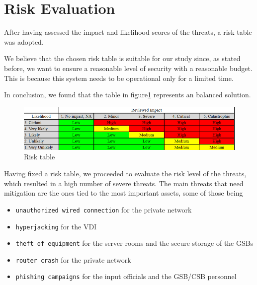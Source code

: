 \section*{Risk Evaluation}

After having assessed the impact and likelihood scores of the threats, a risk table was adopted. 

We believe that the chosen risk table is suitable for our study since, as stated before, we want to ensure a reasonable level of security with a reasonable budget. This is because this system needs to be operational only for a limited time.

In conclusion, we found that the table in figure\ref{fig:riskTable} represents an balanced solution. 

\begin{figure}[]
    \centering
    \includegraphics[keepaspectratio,width=1\textwidth]{03-risk-analysis/004-RE/img/riskTable.png}
    \caption{Risk table}
    \label{fig:riskTable}
\end{figure}

Having fixed a risk table, we proceeded to evaluate the risk level of the threats, which resulted in a high number of severe threats. The main threats that need mitigation are the ones tied to the most important assets, some of those being

\begin{itemize}
    \item \texttt{unauthorized wired connection} for the private network
    \item \texttt{hyperjacking} for the VDI
    \item \texttt{theft of equipment} for the server rooms and the secure storage of the GSBs
    \item \texttt{router crash} for the private network
    \item \texttt{phishing campaigns} for the input officials and the GSB/CSB personnel
\end{itemize}

